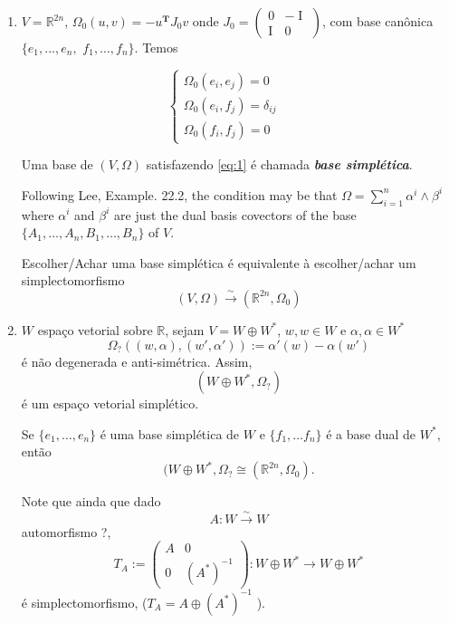 \begin{example}\leavevmode 
	\begin{enumerate}
	\item $V=\mathbb{R}^{2n}$, $\Omega_0(u,v)=-u^{\mathbf{T}} J_0v$ onde $J_0=\begin{pmatrix}0&-\operatorname{I}\\\operatorname{I}&0\end{pmatrix}$, com base can\^onica $\{e_1,\ldots,e_n,$ $f_1,\ldots,f_n\} $. Temos

\begin{equation}\label{eq:1}
	\begin{cases}
				\Omega_0(e_i,e_{j})=0\\
				\Omega_0(e_i,f_j)=\delta_{ij} \\
				\Omega_0(f_i,f_j)=0
				\qquad &
			\end{cases}
\end{equation}

\begin{defn}
	Uma base de $(V,\Omega)$ satisfazendo \cref{eq:1} \'e chamada \textit{\textbf{base simpl\'etica}}.
\end{defn}

Following Lee, Example. 22.2, the condition may be that $\Omega=\sum_{i=1}^{n} \alpha^{i} \wedge \beta^{i}$ where $\alpha^{i}$ and $\beta^{i}$ are just the dual basis covectors of the base $\{A_{1},\ldots,A_{n},B_1,\ldots,B_{n}\} $ of $V$.

\begin{remark}\leavevmode 
		Escolher/Achar uma base simpl\'etica \'e equivalente \`a escolher/achar um simplectomorfismo
	\[(V,\Omega)\overset{\sim}{\to }(\mathbb{R}^{2n},\Omega_{0})\]
\end{remark}

	\item $W$ espa\c co vetorial sobre $\mathbb{R}$, sejam $V=W\oplus W^{*}$, $w,w\in W$ e $\alpha,\alpha \in W^{*}$
		\[\Omega_{\operatorname{?}}( (w,\alpha),(w',\alpha')):=\alpha'(w)-\alpha(w')\]
		\'e n\~ao degenerada e anti-sim\'etrica. Assim,
		\[(W\oplus W^{*},\Omega_{?})\]
	\'e um espa\c co vetorial simpl\'etico.

\begin{remark}
	Se $\{e_1,\ldots,e_n\} $ \'e uma base simpl\'etica de $W$ e $\{f_1,\ldots f_n\} $ \'e a base dual de $W^{*}$, ent\~ao
\[(W\oplus W^{*},\Omega_{?}\cong (\mathbb{R}^{2n},\Omega_0).\]
\end{remark}

Note que ainda que dado 
\[A:W\overset{\sim}{\to}W\]
automorfismo ?,
\[T_{A}:=\begin{pmatrix}A&0\\0&(A^{*} )^{-1}\end{pmatrix}:W\oplus W^{*} \to W\oplus W^{*}\]
\'e simplectomorfismo, ($T_{A}=A\oplus (A^{*} )^{-1}$ ).


\end{enumerate}
\end{example}
